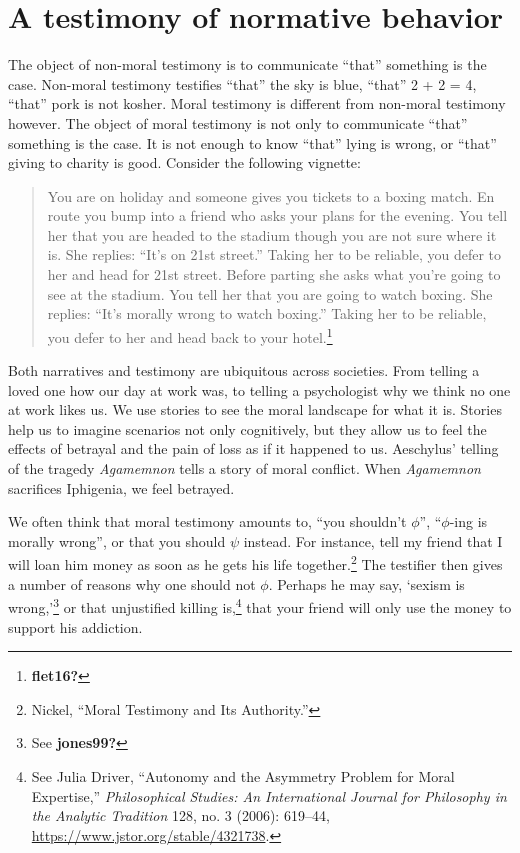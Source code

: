 \documentclass[
  12pt,
]{book}
\theoremstyle{definition}
\theoremstyle{definition}
\theoremstyle{definition}
\theoremstyle{definition}
\theoremstyle{remark}
\begin{document}
\section{A testimony of normative behavior}\label{a-testimony-of-normative-behavior}

The object of non-moral testimony is to communicate ``that'' something is the case. Non-moral testimony testifies ``that'' the sky is blue, ``that'' 2 + 2 = 4, ``that'' pork is not kosher. Moral testimony is different from non-moral testimony however. The object of moral testimony is not only to communicate ``that'' something is the case. It is not enough to know ``that'' lying is wrong, or ``that'' giving to charity is good. Consider the following vignette:

\begin{quote}
You are on holiday and someone gives you tickets to a boxing match. En route you bump into a friend who asks your plans for the evening. You tell her that you are headed to the stadium though you are not sure where it is. She replies: ``It's on 21st street.'' Taking her to be reliable, you defer to her and head for 21st street. Before parting she asks what you're going to see at the stadium. You tell her that you are going to watch boxing. She replies: ``It's morally wrong to watch boxing.'' Taking her to be reliable, you defer to her and head back to your hotel.\footnote{\textbf{flet16?}}
\end{quote}

Both narratives and testimony are ubiquitous across societies. From telling a loved one how our day at work was, to telling a psychologist why we think no one at work likes us. We use stories to see the moral landscape for what it is. Stories help us to imagine scenarios not only cognitively, but they allow us to feel the effects of betrayal and the pain of loss as if it happened to us. Aeschylus' telling of the tragedy \emph{Agamemnon} tells a story of moral conflict. When \emph{Agamemnon} sacrifices Iphigenia, we feel betrayed.

We often think that moral testimony amounts to, ``you shouldn't \(\phi\)'', ``\(\phi\)-ing is morally wrong'', or that you should \(\psi\) instead. For instance, tell my friend that I will loan him money as soon as he gets his life together.\footnote{Nickel, {``Moral {Testimony} and Its {Authority}.''}} The testifier then gives a number of reasons why one should not \(\phi\). Perhaps he may say, `sexism is wrong,'\footnote{See \textbf{jones99?}} or that unjustified killing is,\footnote{See Julia Driver, {``Autonomy and the {Asymmetry Problem} for {Moral Expertise},''} \emph{Philosophical Studies: An International Journal for Philosophy in the Analytic Tradition} 128, no. 3 (2006): 619--44, \url{https://www.jstor.org/stable/4321738}.} that your friend will only use the money to support his addiction.
\end{document}
